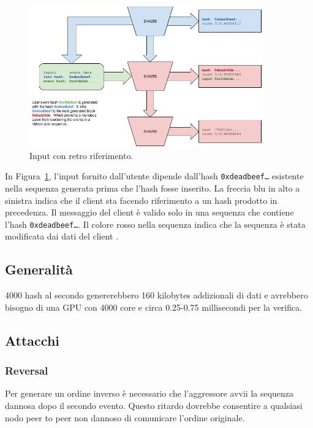 \documentclass[12pt]{article}
\begin{document}
\begin{figure}
  \begin{center}
    \centering
    \includegraphics[width=0.9\textwidth]{figures/fig_6.png}
    \caption[Fig 6]{Input con retro riferimento.\label{fig:poh_consistency}}
  \end{center}
  \end{figure}

In Figura~\ref{fig:poh_consistency}, l'input fornito dall'utente dipende dall'hash \texttt{0xdeadbeef\ldots} esistente nella sequenza generata prima che l'hash fosse inserito. La freccia blu in alto a sinistra indica che il client sta facendo riferimento a un hash prodotto in precedenza. Il messaggio del client è valido solo in una sequenza che contiene l'hash \texttt{0xdeadbeef\ldots}. Il colore rosso nella sequenza indica che la sequenza è stata modificata dai dati del client	.

\subsection{Generalità}
4000 hash al secondo genererebbero 160 kilobytes addizionali di dati e avrebbero bisogno di una GPU con 4000 core e circa 0.25-0.75 millisecondi per la verifica.

\subsection{Attacchi}
\subsubsection{Reversal}
 Per generare un ordine inverso è necessario che l'aggressore avvii la sequenza dannosa dopo il secondo evento. Questo ritardo dovrebbe consentire a qualsiasi nodo peer to peer non dannoso di comunicare l'ordine originale.
 
\end{document}

